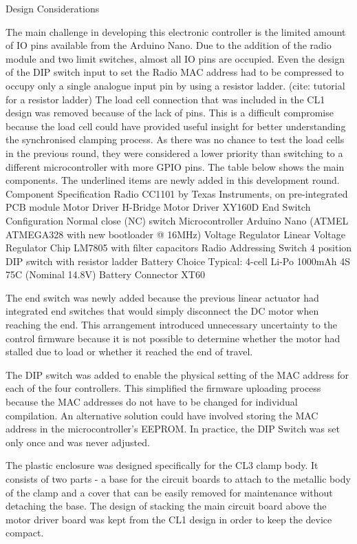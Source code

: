 \begin{itemize}
Design Considerations

The main challenge in developing this electronic controller is the limited amount of IO pins available from the Arduino Nano. Due to the addition of the radio module and two limit switches, almost all IO pins are occupied. Even the design of the DIP switch input to set the Radio MAC address had to be compressed to occupy only a single analogue input pin by using a resistor ladder. (cite: tutorial for a resistor ladder)
The load cell connection that was included in the CL1 design was removed because of the lack of pins. This is a difficult compromise because the load cell could have provided useful insight for better understanding the synchronised clamping process. As there was no chance to test the load cells in the previous round, they were considered a lower priority than switching to a different microcontroller with more GPIO pins.  
The table below shows the main components. The underlined items are newly added in this development round. 
Component
Specification
Radio
CC1101 by Texas Instruments, on pre-integrated PCB module
Motor Driver
H-Bridge Motor Driver XY160D
End Switch Configuration
Normal close (NC) switch
Microcontroller
Arduino Nano (ATMEL ATMEGA328 with new bootloader @ 16MHz)
Voltage Regulator
 Linear Voltage Regulator Chip LM7805 with filter capacitors
Radio Addressing Switch
 4 position DIP switch with resistor ladder
Battery Choice
Typical: 4-cell Li-Po 1000mAh 4S 75C (Nominal 14.8V)
Battery Connector
XT60 


The end switch was newly added because the previous linear actuator had integrated end switches that would simply disconnect the DC motor when reaching the end. This arrangement introduced unnecessary uncertainty to the control firmware because it is not possible to determine whether the motor had stalled due to load or whether it reached the end of travel.

The DIP switch was added to enable the physical setting of the MAC address for each of the four controllers. This simplified the firmware uploading process because the MAC addresses do not have to be changed for individual compilation. An alternative solution could have involved storing the MAC address in the microcontroller's EEPROM. In practice, the DIP Switch was set only once and was never adjusted. 

The plastic enclosure was designed specifically for the CL3 clamp body. It consists of two parts - a base for the circuit boards to attach to the metallic body of the clamp and a cover that can be easily removed for maintenance without detaching the base. The design of stacking the main circuit board above the motor driver board was kept from the CL1 design in order to keep the device compact. 


\end{itemize}
